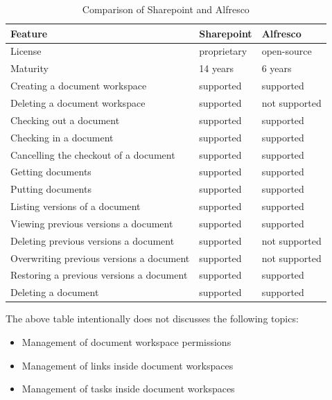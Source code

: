 \begin{table}[H]
  \begin{center}
    \begin{tabular}{| l | l | l |}
    \hline
    \textbf{Feature} & \textbf{Sharepoint} & \textbf{Alfresco} \\ \hline
    License & proprietary & open-source \\ \hline
    Maturity & 14 years\cite{sphist} & 6 years \\ \hline
    Creating a document workspace & supported & supported \\ \hline
    Deleting a document workspace & supported & not supported \\ \hline
    Checking out a document & supported & supported \\ \hline
    Checking in a document & supported & supported \\ \hline
    Cancelling the checkout of a document & supported & supported \\ \hline
    Getting documents & supported & supported \\ \hline
    Putting documents & supported & supported \\ \hline
    Listing versions of a document & supported & supported \\ \hline
    Viewing previous versions a document & supported & supported \\ \hline
    Deleting previous versions a document & supported & not supported \\ \hline
    Overwriting previous versions a document & supported & not supported \\ \hline
    Restoring a previous versions a document & supported & supported \\ \hline
    Deleting a document & supported & supported \\ \hline
    \end{tabular}
  \end{center}
  \caption{Comparison of Sharepoint and Alfresco}
\end{table}

The above table intentionally does not discusses the following topics:

\begin{itemize}
\item Management of document workspace permissions
\item Management of links inside document workspaces
\item Management of tasks inside document workspaces
\end{itemize}


